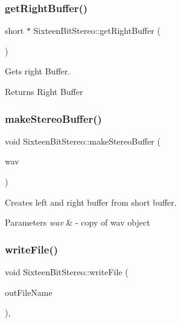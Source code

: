 \subsubsection{\texorpdfstring{get\+Right\+Buffer()}{getRightBuffer()}}
{\footnotesize\ttfamily short $\ast$ Sixteen\+Bit\+Stereo\+::get\+Right\+Buffer (\begin{DoxyParamCaption}{ }\end{DoxyParamCaption})}

Gets right Buffer. \begin{DoxyReturn}{Returns}
Right Buffer 
\end{DoxyReturn}
\mbox{\label{classSixteenBitStereo_ae3432aada39f3db75e6452a141eb8465}} 
\subsubsection{\texorpdfstring{make\+Stereo\+Buffer()}{makeStereoBuffer()}}
{\footnotesize\ttfamily void Sixteen\+Bit\+Stereo\+::make\+Stereo\+Buffer (\begin{DoxyParamCaption}\item[{const \hyperlink{classWav}{Wav} \&}]{wav }\end{DoxyParamCaption})}

Creates left and right buffer from short buffer.


\begin{DoxyParams}{Parameters}
{\em wav} & -\/ copy of wav object \\
\hline
\end{DoxyParams}
\mbox{\label{classSixteenBitStereo_afe9914b160b78f406186aa6de864c288}} 
\subsubsection{\texorpdfstring{write\+File()}{writeFile()}}
{\footnotesize\ttfamily void Sixteen\+Bit\+Stereo\+::write\+File (\begin{DoxyParamCaption}\item[{const std\+::string \&}]{out\+File\+Name }\end{DoxyParamCaption})\hspace{0.3cm}{\ttfamily [override]}, {\ttfamily [virtual]}}

